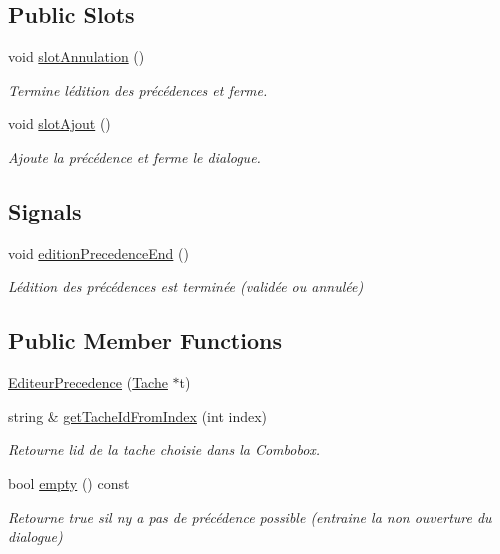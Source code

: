 \subsection*{Public Slots}
\begin{DoxyCompactItemize}
\item 
void \hyperlink{class_editeur_precedence_a6553c232071fb5b260266f42ff68e034}{slot\+Annulation} ()
\begin{DoxyCompactList}\small\item\em Termine l\textquotesingle{}édition des précédences et ferme. \end{DoxyCompactList}\item 
void \hyperlink{class_editeur_precedence_a8afea493809dd7de5adf873cf53c2269}{slot\+Ajout} ()
\begin{DoxyCompactList}\small\item\em Ajoute la précédence et ferme le dialogue. \end{DoxyCompactList}\end{DoxyCompactItemize}
\subsection*{Signals}
\begin{DoxyCompactItemize}
\item 
void \hyperlink{class_editeur_precedence_abc08fe095980f3562b33d5d77db2b78c}{edition\+Precedence\+End} ()
\begin{DoxyCompactList}\small\item\em L\textquotesingle{}édition des précédences est terminée (validée ou annulée) \end{DoxyCompactList}\end{DoxyCompactItemize}
\subsection*{Public Member Functions}
\begin{DoxyCompactItemize}
\item 
\hyperlink{class_editeur_precedence_a60f724870e7782eb7173899301697de7}{Editeur\+Precedence} (\hyperlink{class_tache}{Tache} $\ast$t)
\item 
string \& \hyperlink{class_editeur_precedence_a4daa5c22356a9d1bd1dff590f8c48493}{get\+Tache\+Id\+From\+Index} (int index)
\begin{DoxyCompactList}\small\item\em Retourne l\textquotesingle{}id de la tache choisie dans la Combobox. \end{DoxyCompactList}\item 
bool \hyperlink{class_editeur_precedence_a23123b51c204c65e76950b3c5fa0145d}{empty} () const 
\begin{DoxyCompactList}\small\item\em Retourne true s\textquotesingle{}il n\textquotesingle{}y a pas de précédence possible (entraine la non ouverture du dialogue) \end{DoxyCompactList}\end{DoxyCompactItemize}


